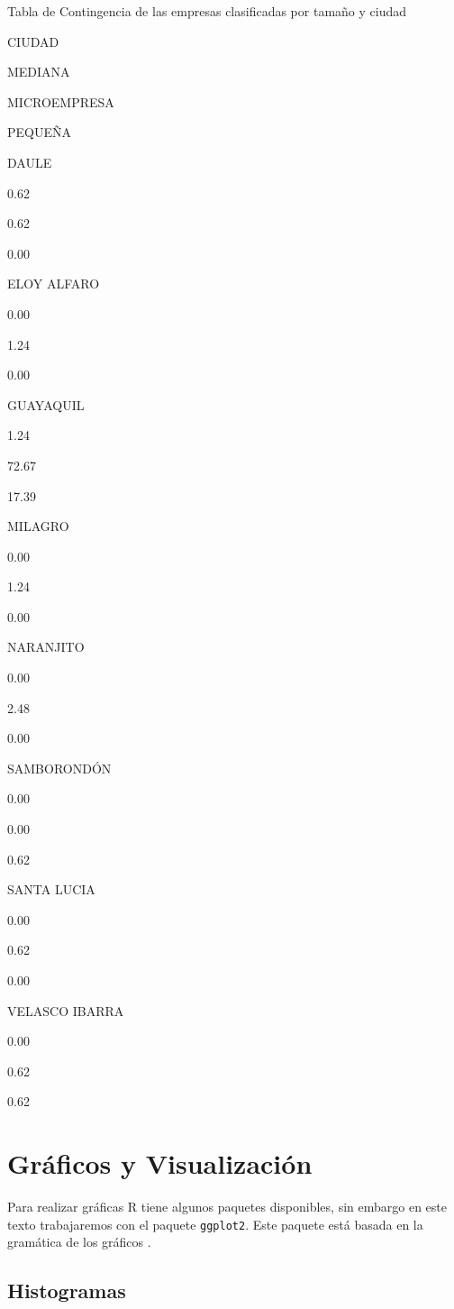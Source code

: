 \documentclass[]{book}
\begin{document}
\label{tab:tabla5}Tabla de Contingencia de las empresas clasificadas por
tamaño y ciudad

CIUDAD

MEDIANA

MICROEMPRESA

PEQUEÑA

DAULE

0.62

0.62

0.00

ELOY ALFARO

0.00

1.24

0.00

GUAYAQUIL

1.24

72.67

17.39

MILAGRO

0.00

1.24

0.00

NARANJITO

0.00

2.48

0.00

SAMBORONDÓN

0.00

0.00

0.62

SANTA LUCIA

0.00

0.62

0.00

VELASCO IBARRA

0.00

0.62

0.62

\section{Gráficos y Visualización}\label{graficos-y-visualizacion}

Para realizar gráficas R tiene algunos paquetes disponibles, sin embargo
en este texto trabajaremos con el paquete \texttt{ggplot2}. Este paquete
está basada en la gramática de los gráficos \citep{wilkinson2005}.

\subsection{Histogramas}\label{histogramas}
\end{document}

